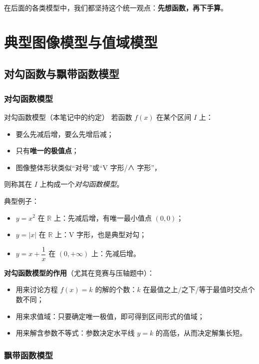\documentclass[a4paper,11pt]{ctexart}
\begin{document}
在后面的各类模型中，我们都坚持这个统一观点：\textbf{先想函数，再下手算}。

\section{典型图像模型与值域模型}

\subsection{对勾函数与飘带函数模型}

\subsubsection{对勾函数模型}

\begin{definitionbox}{对勾函数模型（本笔记中的约定）}
  若函数 $f(x)$ 在某个区间 $I$ 上：
  \begin{itemize}
    \item 要么先减后增，要么先增后减；
    \item 只有\textbf{唯一的极值点}；
    \item 图像整体形状类似“对号”或“V 字形/∧ 字形”，
  \end{itemize}
  则称其在 $I$ 上构成一个\emph{对勾函数模型}。
\end{definitionbox}

典型例子：

\begin{itemize}
  \item $y=x^2$ 在 $\mathbb{R}$ 上：先减后增，有唯一最小值点 $(0,0)$；
  \item $y=|x|$ 在 $\mathbb{R}$ 上：V 字形，也是典型对勾；
  \item $y=x+\dfrac{1}{x}$ 在 $(0,+\infty)$ 上：先减后增。
\end{itemize}

\textbf{对勾函数模型的作用}（尤其在竞赛与压轴题中）：

\begin{itemize}
  \item 用来讨论方程 $f(x)=k$ 的解的个数：$k$ 在最值之上/之下/等于最值时交点个数不同；
  \item 用来求值域：只要确定唯一极值，即可得到区间形式的值域；
  \item 用来解含参数不等式：参数决定水平线 $y=k$ 的高低，从而决定解集长短。
\end{itemize}

\subsubsection{飘带函数模型}
\end{document}
